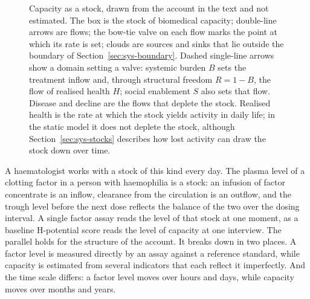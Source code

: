 \begin{figure}[htbp]
{}
\caption[Capacity as a stock with inflows, outflows and valves]{Capacity as a
stock, drawn from the account in the text and not estimated. The box is the
stock of biomedical capacity; double-line arrows are flows; the bow-tie valve
on each flow marks the point at which its rate is set; clouds are sources and
sinks that lie outside the boundary of Section~\ref{sec:sys-boundary}. Dashed
single-line arrows show a domain setting a valve: systemic burden $B$ sets the
treatment inflow and, through structural freedom $R=1-B$, the flow of realised
health $H$; social enablement $S$ also sets that flow. Disease and decline are
the flows that deplete the stock. Realised health is the rate at which the
stock yields activity in daily life; in the static model it does not deplete
the stock, although Section~\ref{sec:sys-stocks} describes how lost activity
can draw the stock down over time.}
\label{fig:sys-stocks}
\end{figure}

A haematologist works with a stock of this kind every day. The plasma level of
a clotting factor in a person with haemophilia is a stock: an infusion of
factor concentrate is an inflow, clearance from the circulation is an outflow,
and the trough level before the next dose reflects the balance of the two over
the dosing interval. A single factor assay reads the level of that stock at
one moment, as a baseline H-potential score reads the level of capacity at
one interview. The parallel holds for the structure of the account. It breaks
down in two places. A factor level is measured directly by an assay against a
reference standard, while capacity is estimated from several indicators that
each reflect it imperfectly. And the time scale differs: a factor level moves
over hours and days, while capacity moves over months and years.

